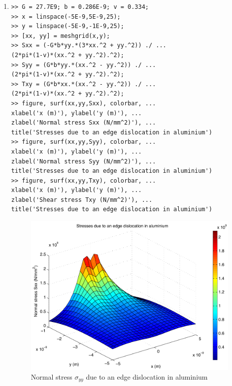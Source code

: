 \begin{enumerate}
\clearpage
\item
\begin{lstlisting}
>> G = 27.7E9; b = 0.286E-9; v = 0.334;
>> x = linspace(-5E-9,5E-9,25);
>> y = linspace(-5E-9,-1E-9,25);
>> [xx, yy] = meshgrid(x,y);
>> Sxx = (-G*b*yy.*(3*xx.^2 + yy.^2)) ./ ...
(2*pi*(1-v)*(xx.^2 + yy.^2).^2);
>> Syy = (G*b*yy.*(xx.^2 - yy.^2)) ./ ...
(2*pi*(1-v)*(xx.^2 + yy.^2).^2);
>> Txy = (G*b*xx.*(xx.^2 - yy.^2)) ./ ...
(2*pi*(1-v)*(xx.^2 + yy.^2).^2);
>> figure, surf(xx,yy,Sxx), colorbar, ...
xlabel('x (m)'), ylabel('y (m)'), ...
zlabel('Normal stress Sxx (N/mm^2)'), ...
title('Stresses due to an edge dislocation in aluminium')
>> figure, surf(xx,yy,Syy), colorbar, ...
xlabel('x (m)'), ylabel('y (m)'), ...
zlabel('Normal stress Syy (N/mm^2)'), ...
title('Stresses due to an edge dislocation in aluminium')
>> figure, surf(xx,yy,Txy), colorbar, ...
xlabel('x (m)'), ylabel('y (m)'), ...
zlabel('Shear stress Txy (N/mm^2)'), ...
title('Stresses due to an edge dislocation in aluminium')
\end{lstlisting}
\begin{figure}[h]
	\myfloatalign
	\includegraphics[width=\linewidth]{Graphics/Additional-Ex/3D-edge-disloc-plot-Sxx}
	\caption{Normal stress $\sigma_{yy}$ due to an edge dislocation in aluminium}
	\label{fig:3D-edge-disloc-plot-Sxx}
\end{figure}
\begin{figure}[h]
	\myfloatalign

\end{figure}
\end{enumerate}
